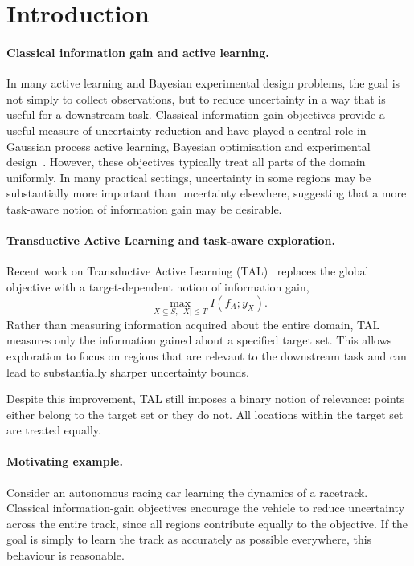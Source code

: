 \section{Introduction}

\paragraph{Classical information gain and active learning.}
In many active learning and Bayesian experimental design problems, the goal is not simply to collect observations, but to reduce uncertainty in a way that is useful for a downstream task. Classical information-gain objectives provide a useful measure of uncertainty reduction and have played a central role in Gaussian process active learning, Bayesian optimisation and experimental design~\cite{Krause2008,Srinivas2009}. However, these objectives typically treat all parts of the domain uniformly. In many practical settings, uncertainty in some regions may be substantially more important than uncertainty elsewhere, suggesting that a more task-aware notion of information gain may be desirable.

\paragraph{Transductive Active Learning and task-aware exploration.}
Recent work on Transductive Active Learning (TAL)~\cite{Huebotter2025} replaces the global objective with a target-dependent notion of information gain,
\begin{equation*}
\max_{X \subseteq S,\ |X|\leq T}
I(f_A;y_X).
\end{equation*}
Rather than measuring information acquired about the entire domain, TAL measures only the information gained about a specified target set. This allows exploration to focus on regions that are relevant to the downstream task and can lead to substantially sharper uncertainty bounds.

Despite this improvement, TAL still imposes a binary notion of relevance: points either belong to the target set or they do not. All locations within the target set are treated equally.

\paragraph{Motivating example.}

Consider an autonomous racing car learning the dynamics of a racetrack. Classical information-gain objectives encourage the vehicle to reduce uncertainty across the entire track, since all regions contribute equally to the objective. If the goal is simply to learn the track as accurately as possible everywhere, this behaviour is reasonable.

